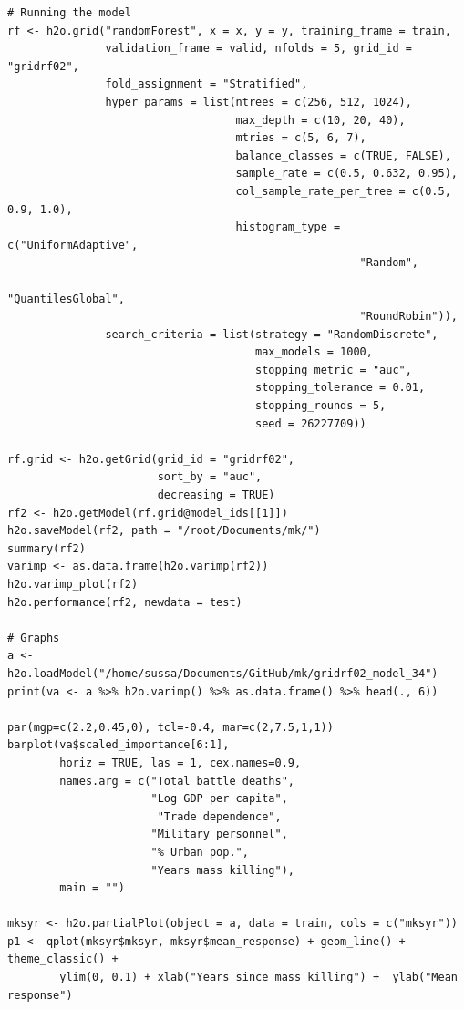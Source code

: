 \documentclass[a4paper,12pt]{article}
\begin{document}
\begin{verbatim}
# Running the model
rf <- h2o.grid("randomForest", x = x, y = y, training_frame = train, 
               validation_frame = valid, nfolds = 5, grid_id = "gridrf02",
               fold_assignment = "Stratified",
               hyper_params = list(ntrees = c(256, 512, 1024),
                                   max_depth = c(10, 20, 40),
                                   mtries = c(5, 6, 7),
                                   balance_classes = c(TRUE, FALSE),
                                   sample_rate = c(0.5, 0.632, 0.95),
                                   col_sample_rate_per_tree = c(0.5, 0.9, 1.0),
                                   histogram_type = c("UniformAdaptive",
                                                      "Random",
                                                      "QuantilesGlobal",
                                                      "RoundRobin")),
               search_criteria = list(strategy = "RandomDiscrete", 
                                      max_models = 1000, 
                                      stopping_metric = "auc", 
                                      stopping_tolerance = 0.01, 
                                      stopping_rounds = 5, 
                                      seed = 26227709)) 

rf.grid <- h2o.getGrid(grid_id = "gridrf02",
                       sort_by = "auc",
                       decreasing = TRUE)
rf2 <- h2o.getModel(rf.grid@model_ids[[1]])
h2o.saveModel(rf2, path = "/root/Documents/mk/")
summary(rf2)
varimp <- as.data.frame(h2o.varimp(rf2))
h2o.varimp_plot(rf2)
h2o.performance(rf2, newdata = test)

# Graphs
a <- h2o.loadModel("/home/sussa/Documents/GitHub/mk/gridrf02_model_34")
print(va <- a %>% h2o.varimp() %>% as.data.frame() %>% head(., 6)) 

par(mgp=c(2.2,0.45,0), tcl=-0.4, mar=c(2,7.5,1,1))
barplot(va$scaled_importance[6:1],
        horiz = TRUE, las = 1, cex.names=0.9,
        names.arg = c("Total battle deaths", 
                      "Log GDP per capita",
                       "Trade dependence",
                      "Military personnel",
                      "% Urban pop.",
                      "Years mass killing"),
        main = "")
        
mksyr <- h2o.partialPlot(object = a, data = train, cols = c("mksyr"))
p1 <- qplot(mksyr$mksyr, mksyr$mean_response) + geom_line() + theme_classic() + 
        ylim(0, 0.1) + xlab("Years since mass killing") +  ylab("Mean response")


\end{verbatim}
\end{document}
